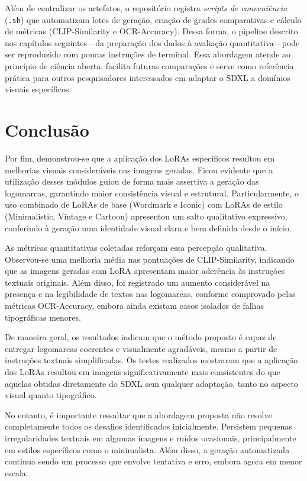 \documentclass[12pt, %
openright, 
oneside, %
a4paper,    %
brazil]{facom-ufu-abntex2}
\begin{document}
Além de centralizar os artefatos, o repositório registra \emph{scripts de conveniência} (\texttt{.sh}) que automatizam lotes de geração, criação de grades comparativas e cálculo de métricas (CLIP-Similarity e OCR-Accuracy). Dessa forma, o pipeline descrito nos capítulos seguintes—da preparação dos dados à avaliação quantitativa—pode ser reproduzido com poucas instruções de terminal. Essa abordagem atende ao princípio de ciência aberta, facilita futuras comparações e serve como referência prática para outros pesquisadores interessados em adaptar o SDXL a domínios visuais específicos.



\chapter[Conclusão]{Conclusão}
Por fim, demonstrou-se que a aplicação dos LoRAs específicos resultou em melhorias visuais consideráveis nas imagens geradas. Ficou evidente que a utilização desses módulos guiou de forma mais assertiva a geração das logomarcas, garantindo maior consistência visual e estrutural. Particularmente, o uso combinado de LoRAs de base (Wordmark e Iconic) com LoRAs de estilo (Minimalistic, Vintage e Cartoon) apresentou um salto qualitativo expressivo, conferindo à geração uma identidade visual clara e bem definida desde o início.

As métricas quantitativas coletadas reforçam essa percepção qualitativa. Observou-se uma melhoria média nas pontuações de CLIP-Similarity, indicando que as imagens geradas com LoRA apresentam maior aderência às instruções textuais originais. Além disso, foi registrado um aumento considerável na presença e na legibilidade de textos nas logomarcas, conforme comprovado pelas métricas OCR-Accuracy, embora ainda existam casos isolados de falhas tipográficas menores.

De maneira geral, os resultados indicam que o método proposto é capaz de entregar logomarcas coerentes e visualmente agradáveis, mesmo a partir de instruções textuais simplificadas. Os testes realizados mostraram que a aplicação dos LoRAs resultou em imagens significativamente mais consistentes do que aquelas obtidas diretamente do SDXL sem qualquer adaptação, tanto no aspecto visual quanto tipográfico.

No entanto, é importante ressaltar que a abordagem proposta não resolve completamente todos os desafios identificados inicialmente. Persistem pequenas irregularidades textuais em algumas imagens e ruídos ocasionais, principalmente em estilos específicos como o minimalista. Além disso, a geração automatizada continua sendo um processo que envolve tentativa e erro, embora agora em menor escala.
\end{document}
